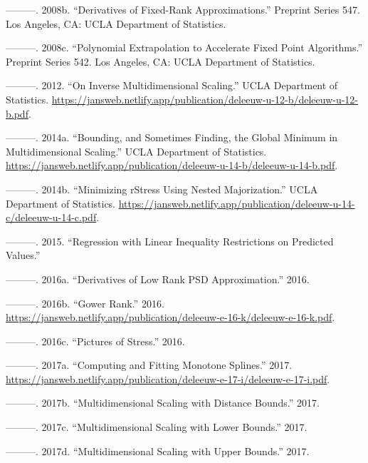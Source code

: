 \documentclass[
  12pt,
  letterpaper,
  DIV=11,
  numbers=noendperiod]{scrreprt}
\newlength{\cslhangindent}
\newenvironment{CSLReferences}[2] %
 {\begin{list}{}{%
  \setlength{\itemindent}{0pt}
  \setlength{\leftmargin}{0pt}
  \setlength{\parsep}{0pt}
  \ifodd #1
   \setlength{\leftmargin}{\cslhangindent}
   \setlength{\itemindent}{-1\cslhangindent}
  \fi
  \setlength{\itemsep}{#2\baselineskip}}}
 {\end{list}}
\theoremstyle{remark}
\begin{document}
\begin{CSLReferences}{1}{0}
---------. 2008b. {``{Derivatives of Fixed-Rank Approximations}.''}
Preprint Series 547. Los Angeles, CA: UCLA Department of Statistics.

---------. 2008c. {``Polynomial Extrapolation to Accelerate Fixed Point
Algorithms.''} Preprint Series 542. Los Angeles, CA: UCLA Department of
Statistics.

---------. 2012. {``{On Inverse Multidimensional Scaling}.''} UCLA
Department of Statistics.
\url{https://jansweb.netlify.app/publication/deleeuw-u-12-b/deleeuw-u-12-b.pdf}.

---------. 2014a. {``{Bounding, and Sometimes Finding, the Global
Minimum in Multidimensional Scaling}.''} UCLA Department of Statistics.
\url{https://jansweb.netlify.app/publication/deleeuw-u-14-b/deleeuw-u-14-b.pdf}.

---------. 2014b. {``{Minimizing rStress Using Nested Majorization}.''}
UCLA Department of Statistics.
\url{https://jansweb.netlify.app/publication/deleeuw-u-14-c/deleeuw-u-14-c.pdf}.

---------. 2015. {``Regression with Linear Inequality Restrictions on
Predicted Values.''}

---------. 2016a. {``{Derivatives of Low Rank PSD Approximation}.''}
2016.

---------. 2016b. {``Gower Rank.''} 2016.
\url{https://jansweb.netlify.app/publication/deleeuw-e-16-k/deleeuw-e-16-k.pdf}.

---------. 2016c. {``Pictures of Stress.''} 2016.

---------. 2017a. {``{Computing and Fitting Monotone Splines}.''} 2017.
\url{https://jansweb.netlify.app/publication/deleeuw-e-17-i/deleeuw-e-17-i.pdf}.

---------. 2017b. {``{Multidimensional Scaling with Distance Bounds}.''}
2017.

---------. 2017c. {``{Multidimensional Scaling with Lower Bounds}.''}
2017.

---------. 2017d. {``{Multidimensional Scaling with Upper Bounds}.''}
2017.


\end{CSLReferences}
\end{document}
